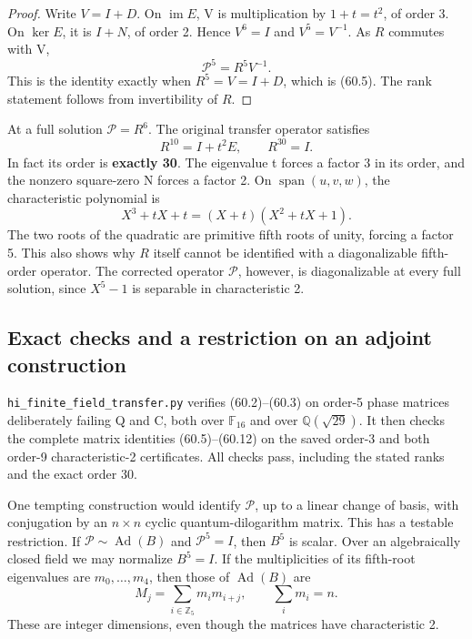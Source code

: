 \documentclass[11pt,reqno]{amsart}
\theoremstyle{plain}
\begin{document}
\begin{proof}
Write \(V=I+D\). On \(\operatorname{im}E\), V is
multiplication by \(1+t=t^2\), of order 3. On \(\ker E\), it is
\(I+N\), of order 2. Hence \(V^6=I\) and \(V^5=V^{-1}\).
As \(R\) commutes with V,
\[
 \mathcal P^5=R^5V^{-1}.
\]
This is the identity exactly when \(R^5=V=I+D\), which is (60.5).
The rank statement follows from invertibility of \(R\).
\end{proof}

At a full solution \(\mathcal P=R^6\). The original transfer
operator satisfies
\begin{equation*}
 R^{10}=I+t^2E,\qquad R^{30}=I.
 \tag{60.12}
\end{equation*}
In fact its order is \textbf{exactly 30}. The eigenvalue t forces a factor
3 in its order, and the nonzero square-zero N forces a factor 2.
On \(\operatorname{span}(u,v,w)\), the characteristic polynomial is
\[
 X^3+tX+t=(X+t)(X^2+tX+1).
\]
The two roots of the quadratic are primitive fifth roots of unity,
forcing a factor 5. This also shows why \(R\) itself cannot be
identified with a diagonalizable fifth-order operator. The corrected
operator \(\mathcal P\), however, is diagonalizable at every full
solution, since \(X^5-1\) is separable in characteristic 2.

\subsection{Exact checks and a restriction on an adjoint construction}\label{sec:60.3}

\texttt{hi\_\allowbreak finite\_\allowbreak field\_\allowbreak transfer.py} verifies (60.2)--(60.3) on order-5
phase matrices deliberately failing Q and C, both over
\(\mathbb F_{16}\) and over \(\mathbb Q(\sqrt{29})\). It then
checks the complete matrix identities (60.5)--(60.12) on the saved
order-3 and both order-9 characteristic-2 certificates. All checks
pass, including the stated ranks and the exact order 30.

One tempting construction would identify \(\mathcal P\), up to a
linear change of basis, with conjugation by an \(n\times n\)
cyclic quantum-dilogarithm matrix. This has a testable restriction.
If \(\mathcal P\sim\operatorname{Ad}(B)\) and
\(\mathcal P^5=I\), then \(B^5\) is scalar. Over an algebraically
closed field we may normalize \(B^5=I\). If the multiplicities of
its fifth-root eigenvalues are \(m_0,\ldots,m_4\), then those of
\(\operatorname{Ad}(B)\) are
\begin{equation*}
 M_j=\sum_{i\in\mathbb Z_5}m_i m_{i+j},\qquad
 \sum_i m_i=n.
 \tag{60.13}
\end{equation*}
These are integer dimensions, even though the matrices have
characteristic 2.
\end{document}
